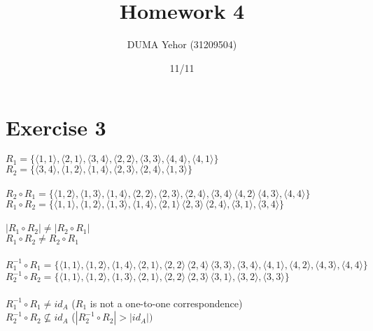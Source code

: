 \documentclass{article}
\title{Homework 4}
\author{DUMA Yehor (31209504)}
\date{11/11}
\begin{document}
\maketitle

\section{Exercise 3}

$R_1 = \{\langle 1,1 \rangle, \langle 2,1 \rangle, \langle 3,4 \rangle, \langle 2,2 \rangle, \langle 3,3 \rangle, \langle 4,4\rangle,\langle 4,1 \rangle\}$ \\
$R_2 = \{\langle 3,4 \rangle, \langle 1,2 \rangle, \langle 1,4 \rangle, \langle 2,3 \rangle, \langle 2,4 \rangle, \langle 1,3\rangle\}$ \\ \\ 
$R_2 \circ R_1 = \{\langle 1,2 \rangle, \langle 1,3 \rangle, \langle 1,4 \rangle, \langle 2,2 \rangle, \langle 2,3 \rangle, \langle 2,4\rangle,
\langle 3,4\rangle\,
\langle 4,2\rangle\,
\langle 4,3\rangle,
\langle 4,4\rangle\}$ \\
$R_1 \circ R_2 = \{  \langle 1,1 \rangle, \langle 1,2 \rangle, \langle 1,3 \rangle, \langle 1,4\rangle,
\langle 2,1\rangle\,
\langle 2,3\rangle\,
\langle 2,4\rangle,
\langle 3,1 \rangle,
\langle 3,4\rangle\}$ \\ \\
$|R_1 \circ R_2| \neq |R_2 \circ R_1|$ \\
$R_1 \circ R_2 \neq R_2 \circ R_1$ \\ \\ 
$R^{-1}_{1} \circ R_1 = \{  \langle 1,1 \rangle, \langle 1,2 \rangle, \langle 1,4 \rangle, \langle 2,1\rangle,
\langle 2,2\rangle\,
\langle 2,4\rangle\,
\langle 3,3\rangle,
\langle 3,4 \rangle,
\langle 4,1\rangle,
\langle 4,2\rangle,
\langle 4,3\rangle,
\langle 4,4\rangle\} $ \\
$R^{-1}_{2} \circ R_2 = \{  \langle 1,1 \rangle, \langle 1,2 \rangle, \langle 1,3 \rangle, \langle 2,1\rangle,
\langle 2,2\rangle\,
\langle 2,3\rangle\,
\langle 3,1\rangle,
\langle 3,2 \rangle,
\langle 3,3\rangle\} $ \\ \\
$R^{-1}_{1} \circ R_1 \neq id_A $ ($R_1$ is not a one-to-one correspondence) \\
$R^{-1}_{2} \circ R_2 \nsubseteq id_A$ ($|R^{-1}_{2} \circ R_2|>|id_A|)$
\end{document}
